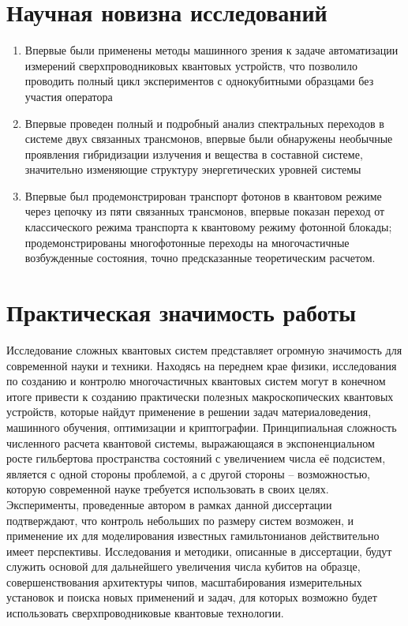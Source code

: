\documentclass[14pt, a4paper]{extreport}
\numberwithin{equation}{section}
\begin{document}
\section*{Научная новизна исследований}

\begin{enumerate}
	\item Впервые были применены методы машинного зрения к задаче автоматизации измерений сверхпроводниковых квантовых устройств, что позволило проводить полный цикл экспериментов с однокубитными образцами без участия оператора
	\item Впервые проведен полный и подробный анализ спектральных переходов в системе двух связанных трансмонов, впервые были обнаружены необычные проявления гибридизации излучения и вещества в составной системе, значительно изменяющие структуру энергетических уровней системы
	\item Впервые был продемонстрирован транспорт фотонов в квантовом режиме через цепочку из пяти связанных трансмонов, впервые показан переход от классического режима транспорта к квантовому режиму фотонной блокады; продемонстрированы многофотонные переходы на многочастичные возбужденные состояния, точно предсказанные теоретическим расчетом.
\end{enumerate}

\section*{Практическая значимость работы}

Исследование сложных квантовых систем представляет огромную значимость для современной науки и техники. Находясь на переднем крае физики, исследования по созданию и контролю многочастичных квантовых систем могут в конечном итоге привести к созданию практически полезных макроскопических квантовых устройств, которые найдут применение в решении задач материаловедения, машинного обучения, оптимизации и криптографии. Принципиальная сложность численного расчета квантовой системы, выражающаяся в экспоненциальном росте гильбертова пространства состояний с увеличением числа её подсистем, является с одной стороны проблемой, а с другой стороны -- возможностью, которую современной науке требуется использовать в своих целях. Эксперименты, проведенные автором в рамках данной диссертации подтверждают, что контроль небольших по размеру систем возможен, и применение их для моделирования известных гамильтонианов действительно имеет перспективы. Исследования и методики, описанные в диссертации, будут служить основой для дальнейшего увеличения числа кубитов на образце, совершенствования архитектуры чипов, масштабирования измерительных установок и поиска новых применений и задач, для которых возможно будет использовать сверхпроводниковые квантовые технологии.
\end{document}
